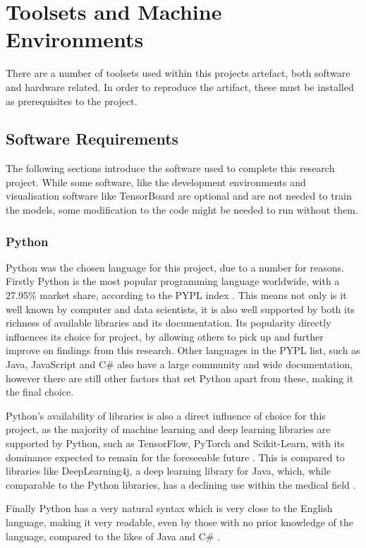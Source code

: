 \section{Toolsets and Machine Environments}
There are a number of toolsets used within this projects artefact, both software and hardware related. In order to reproduce the artifact, these must be installed as prerequisites to the project.

\subsection{Software Requirements}
The following sections introduce the software used to complete this research project. While some software, like the development environments and visualisation software like TensorBoard are optional and are not needed to train the models, some modification to the code might be needed to run without them.


\subsubsection{Python}
Python was the chosen language for this project, due to a number for reasons. Firstly Python is the most popular programming language worldwide, with a 27.95\% market share, according to the PYPL index \citep{PYPLPopu3:online}. This means not only is it well known by computer and data scientists, it is also well supported by both its richness of available libraries and its documentation. Its popularity directly influences its choice for project, by allowing others to pick up and further improve on findings from this research. Other languages in the PYPL list, such as Java, JavaScript and C\# also have a large community and wide documentation, however there are still other factors that set Python apart from these, making it the final choice. 

Python's availability of libraries is also a direct influence of choice for this project, as the majority of machine learning and deep learning libraries are supported by Python, such as TensorFlow, PyTorch and Scikit-Learn, with its dominance expected to remain for the foreseeable future \citep{raschka2020machine}. This is compared to libraries like DeepLearning4j, a deep learning library for Java, which, while comparable to the Python libraries, has a declining use within the medical field \citep{erickson2017toolkits}. 

Finally Python has a very natural syntax which is very close to the English language, making it very readable, even by those with no prior knowledge of the language, compared to the likes of Java and C\# \citep{srinath2017python}.

